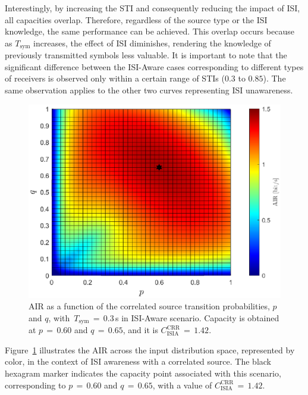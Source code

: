 \documentclass[journal]{IEEEtranTCOM}
\begin{document}
Interestingly, by increasing the STI and consequently reducing the impact of ISI, all capacities overlap. Therefore, regardless of the source type or the ISI knowledge, the same performance can be achieved. This overlap occurs because as $T_{\mathrm{sym}}$ increases, the effect of ISI diminishes, rendering the knowledge of previously transmitted symbols less valuable. It is important to note that the significant difference between the ISI-Aware cases corresponding to different types of receivers is observed only within a certain range of STIs ($0.3$ to $0.85$). The same observation applies to the other two curves representing ISI unawareness. 
\begin{figure}
    \centering
    \includegraphics[width=1\linewidth]{Figures/ISIA_CRR_Tsym3e-1.eps}
    \caption{AIR as a function of the correlated source transition probabilities, $p$ and $q$, with~$T_{\mathrm{sym}}$$\,=\,$$0.3$\,s in ISI-Aware scenario. Capacity is obtained at $p$$\,=\,$$0.60$ and $q$$\,=\,$$0.65$, and it is $C_{\text{ISIA}}^{\text{CRR}}$$\,=\,$$1.42$.}
    \label{fig:C_ISIA_CRR_Tsym3e-1}
\end{figure}
\par Figure~\ref{fig:C_ISIA_CRR_Tsym3e-1} illustrates the AIR across the input distribution space, represented by color, in the context of ISI awareness with a correlated source. The black hexagram marker indicates the capacity point associated with this scenario, corresponding to $p$$\,=\,$$0.60$ and $q$$\,=\,$$0.65$, with a value of $C_{\text{ISIA}}^{\text{CRR}}$$\,=\,$$1.42$.
\end{document}
